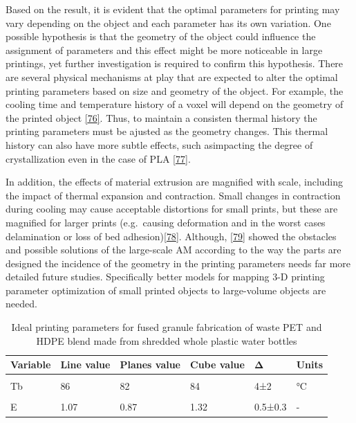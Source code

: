 \documentclass[
]{article}
\begin{document}
Based on the result, it is evident that the optimal parameters for
printing may vary depending on the object and each parameter has its own
variation. One possible hypothesis is that the geometry of the object
could influence the assignment of parameters and this effect might be
more noticeable in large printings, yet further investigation is
required to confirm this hypothesis. There are several physical
mechanisms at play that are expected to alter the optimal printing
parameters based on size and geometry of the object. For example, the
cooling time and temperature history of a voxel will depend on the
geometry of the printed object
\protect\hyperlink{ref-cleeman2022}{{[}76{]}}. Thus, to maintain a
consisten thermal history the printing parameters must be ajusted as the
geometry changes. This thermal history can also have more subtle
effects, such asimpacting the degree of crystallization even in the case
of PLA \protect\hyperlink{ref-wijnen2018}{{[}77{]}}.

In addition, the effects of material extrusion are magnified with scale,
including the impact of thermal expansion and contraction. Small changes
in contraction during cooling may cause acceptable distortions for small
prints, but these are magnified for larger prints (e.g.~causing
deformation and in the worst cases delamination or loss of bed
adhesion)\protect\hyperlink{ref-shah2019}{{[}78{]}}. Although,
\protect\hyperlink{ref-roschli2019}{{[}79{]}} showed the obstacles and
possible solutions of the large-scale AM according to the way the parts
are designed the incidence of the geometry in the printing parameters
needs far more detailed future studies. Specifically better models for
mapping 3-D printing parameter optimization of small printed objects to
large-volume objects are needed.

\hypertarget{tbl-table3}{}
\begin{table}
\caption{\label{tbl-table3}Ideal printing parameters for fused granule fabrication of waste PET and
HDPE blend made from shredded whole plastic water bottles }\tabularnewline

\centering\begingroup\fontsize{10}{12}\selectfont

\begin{tabular}[t]{llllll}
\toprule
Variable & Line value & Planes value & Cube value & Δ & Units\\
\midrule
\cellcolor{gray!6}{T1} & \cellcolor{gray!6}{258} & \cellcolor{gray!6}{263} & \cellcolor{gray!6}{264} & \cellcolor{gray!6}{6 ±3.2} & \cellcolor{gray!6}{°C}\\
Tb & 86 & 82 & 84 & 4±2 & °C\\
\cellcolor{gray!6}{Ps} & \cellcolor{gray!6}{21} & \cellcolor{gray!6}{14} & \cellcolor{gray!6}{10} & \cellcolor{gray!6}{11±5.6} & \cellcolor{gray!6}{mm/s}\\
E & 1.07 & 0.87 & 1.32 & 0.5±0.3 & -\\
\bottomrule
\end{tabular}
\endgroup{}
\end{table}
\end{document}

